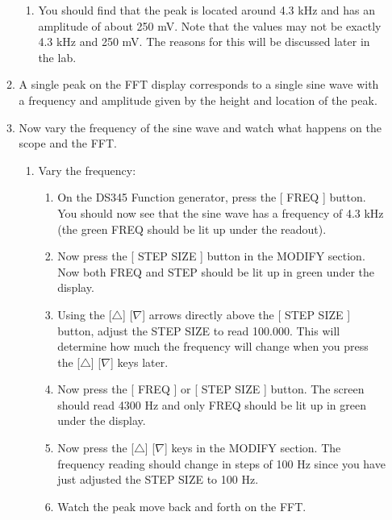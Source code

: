 \documentclass{../lab}
\begin{document}
\begin{enumerate}
\begin{enumerate}
\begin{enumerate}
            \item You should find that the peak is located around 4.3 kHz and has an amplitude of about 250 mV. Note that the values may not be exactly 4.3 kHz and 250 mV. The reasons for this will be discussed later in the lab.

        \end{enumerate}

        \item A single peak on the FFT display corresponds to a single sine wave with a frequency and amplitude given by the height and location of the peak.

        \item Now vary the frequency of the sine wave and watch what happens on the scope and the FFT.
        \begin{enumerate}
            \item Vary the frequency:
            \begin{enumerate}
                \item On the DS345 Function generator, press the [ FREQ ] button. You should now see that the sine wave has a frequency of 4.3 kHz (the green FREQ should be lit up under the readout).

                \item Now press the [ STEP SIZE ] button in the MODIFY section. Now both FREQ and STEP should be lit up in green under the display.

                \item Using the [$\triangle$] [$\nabla$] arrows directly above the [ STEP SIZE ] button, adjust the STEP SIZE to read 100.000. This will determine how much the frequency will change when you press the [$\triangle$] [$\nabla$] keys later.

                \item Now press the [ FREQ ] or [ STEP SIZE ] button. The screen should read 4300 Hz and only FREQ should be lit up in green under the display.

                \item Now press the [$\triangle$] [$\nabla$] keys in the MODIFY section. The frequency reading should change in steps of 100 Hz since you have just adjusted the STEP SIZE to 100 Hz.

                \item Watch the peak move back and forth on the FFT.

            \end{enumerate}


\end{enumerate}
\end{enumerate}
\end{enumerate}
\end{document}
